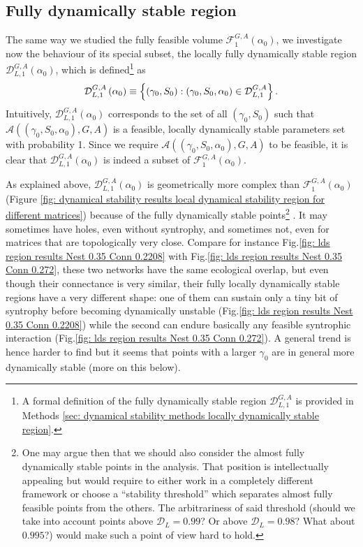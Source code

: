\documentclass[12pt, titlepage]{report}
\begin{document}
\subsection{Fully dynamically stable region}
The same way we studied the fully feasible volume $\mathcal{F}_{1}^{G,A}(\alpha_0)$, we investigate now the behaviour of its special subset, the locally fully dynamically stable region $\mathcal{D}^{G,A}_{L,1}\left(\alpha_0\right)$, which is defined\footnote{A formal definition of the fully dynamically stable region $\mathcal{D}^{G,A}_{L,1}$ is provided in Methods \ref{sec: dynamical stability methods locally dynamically stable region}.} as
\begin{equation}
\mathcal{D}_{L,1}^{G,A}\left(\alpha_0\right) \equiv \left\{ (\gamma_0, S_0) : (\gamma_0, S_0, \alpha_0) \in \mathcal{D}^{G,A}_{L,1} \right\}.
\end{equation}
 Intuitively, $\mathcal{D}^{G,A}_{L,1}\left(\alpha_0\right)$ corresponds to the set of all $(\gamma_0, S_0)$ such that $\mathcal{A}\left((\gamma_0, S_0, \alpha_0), G, A\right)$ is a feasible, locally dynamically stable parameters set with probability 1. Since we require $\mathcal{A}\left((\gamma_0, S_0, \alpha_0), G, A\right)$ to be feasible, it is clear that $\mathcal{D}^{G,A}_{L,1}\left(\alpha_0\right)$ is indeed a subset of $\mathcal{F}^{G,A}_1\left(\alpha_0\right)$.

As explained above, $\mathcal{D}_{L,1}^{G,A}\left(\alpha_0\right)$ is geometrically more complex than $\mathcal{F}_{1}^{G,A}\left(\alpha_0\right)$ (Figure \ref{fig: dynamical stability results local dynamical stability region for different matrices}) because of the  fully dynamically stable points\footnote{One may argue then that we should also consider the {almost} fully dynamically stable points in the analysis. That position is intellectually appealing but would require to either work in a completely different framework or choose a ``stability threshold'' which separates almost fully feasible points from the others. The arbitrariness of said threshold (should we take into account points above $\mathcal{D}_L=0.99$? Or above $\mathcal{D}_L=0.98$? What about $0.995$?) would make such a point of view hard to hold.}
. It may sometimes have holes, even without syntrophy, and sometimes not, even for matrices that are topologically very close. Compare for instance Fig.\ref{fig: lds region results Nest 0.35 Conn 0.2208} with Fig.\ref{fig: lds region results Nest 0.35 Conn 0.272}, these two networks have the same ecological overlap, but even though their connectance is very similar, their fully locally dynamically stable regions have a very different shape: one of them can sustain only a tiny bit of syntrophy before becoming dynamically unstable (Fig.\ref{fig: lds region results Nest 0.35 Conn 0.2208}) while the second can endure basically any feasible syntrophic interaction (Fig.\ref{fig: lds region results Nest 0.35 Conn 0.272}). A general trend is hence harder to find but it seems that points with a larger $\gamma_0$ are in general more dynamically stable (more on this below).
\end{document}
